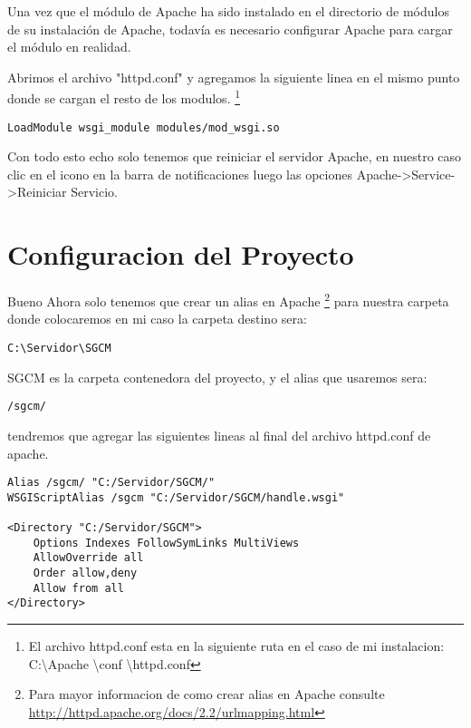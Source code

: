 Una vez que el módulo de Apache ha sido instalado en el directorio de módulos
de su instalación de Apache, todavía es necesario configurar Apache para cargar
el módulo en realidad.

Abrimos el archivo "httpd.conf" y agregamos la siguiente linea en el mismo
punto donde se cargan el resto de los modulos. \footnote {El archivo httpd.conf
esta en la siguiente ruta en el caso de mi instalacion:
C:\textbackslash Apache \textbackslash conf \textbackslash httpd.conf}

\begin{lstlisting}[style=consola]
    LoadModule wsgi_module modules/mod_wsgi.so
\end{lstlisting}
\vspace{0.1cm}

Con todo esto echo solo tenemos que reiniciar el servidor Apache, en nuestro
 caso clic en el icono en la barra de notificaciones luego las opciones
 Apache->Service->Reiniciar Servicio. 

\section{Configuracion del Proyecto}

Bueno Ahora solo tenemos que crear un alias en Apache \footnote{Para mayor
informacion de como crear alias en Apache consulte
\url{http://httpd.apache.org/docs/2.2/urlmapping.html}} para nuestra carpeta
donde colocaremos en mi caso la carpeta destino sera:

\begin{lstlisting}[style=consola]
	C:\Servidor\SGCM
\end{lstlisting}
\vspace{0.1cm}

SGCM es la carpeta contenedora del proyecto, y el alias que usaremos sera:

\begin{lstlisting}[style=consola]
	/sgcm/ 
\end{lstlisting}
\vspace{0.1cm}

tendremos que agregar las siguientes lineas al final del archivo
httpd.conf de apache.

\begin{lstlisting}[style=HTML]
Alias /sgcm/ "C:/Servidor/SGCM/" 
WSGIScriptAlias /sgcm "C:/Servidor/SGCM/handle.wsgi" 

<Directory "C:/Servidor/SGCM">
    Options Indexes FollowSymLinks MultiViews
    AllowOverride all
    Order allow,deny
    Allow from all
</Directory>
\end{lstlisting}
\vspace{0.1cm}


